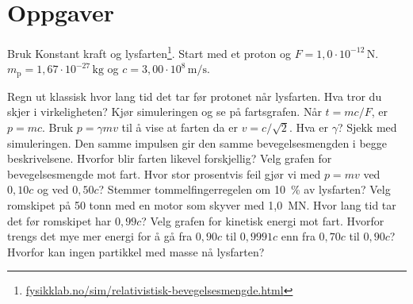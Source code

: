 \documentclass[11pt]{article}
\begin{document}

\section*{Oppgaver}

Bruk Konstant kraft og lysfarten\footnote{\url{fysikklab.no/sim/relativistisk-bevegelsesmengde.html}}. Start med et proton og $F = 1{,}0 \cdot 10^{-12}\,\mathrm{N}$. $m_{\mathrm{p}} = 1{,}67 \cdot 10^{-27}\,\mathrm{kg}$ og $c = 3{,}00 \cdot 10^{8}\,\mathrm{m/s}$.

\begin{oppgaveliste}
\oppgave {}Regn ut klassisk hvor lang tid det tar før protonet når lysfarten. Hva tror du skjer i virkeligheten? Kjør simuleringen og se på fartsgrafen.
\svar
\oppgave {}Når $t = mc/F$, er $p = mc$. Bruk $p = γmv$ til å vise at farten da er $v = c/\sqrt{2}$. Hva er $γ$? Sjekk med simuleringen.
\svar
\oppgave {}Den samme impulsen gir den samme bevegelsesmengden i begge beskrivelsene. Hvorfor blir farten likevel forskjellig?
\svar
\oppgave {}Velg grafen for bevegelsesmengde mot fart. Hvor stor prosentvis feil gjør vi med $p = mv$ ved $0{,}10c$ og ved $0{,}50c$? Stemmer tommelfingerregelen om 10~\% av lysfarten?
\svar
\oppgave {}Velg romskipet på 50 tonn med en motor som skyver med 1,0~MN. Hvor lang tid tar det før romskipet har $0{,}99c$?
\svar
\oppgave {}Velg grafen for kinetisk energi mot fart. Hvorfor trengs det mye mer energi for å gå fra $0{,}90c$ til $0{,}9991c$ enn fra $0{,}70c$ til $0{,}90c$? Hvorfor kan ingen partikkel med masse nå lysfarten?
\svar
\end{oppgaveliste}
\end{document}
